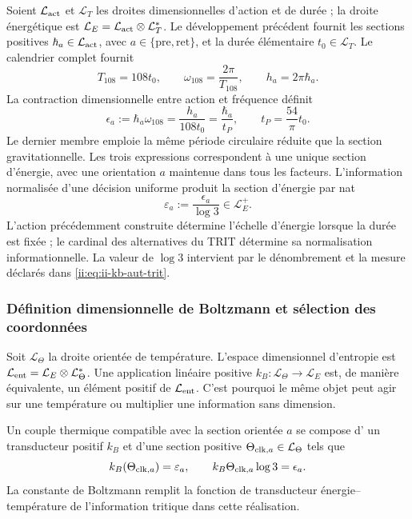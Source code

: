 Soient \(\mathcal L_{\rm act}\) et \(\mathcal L_T\) les droites
dimensionnelles d'action et de durée ; la droite énergétique est
\(\mathcal L_E=\mathcal L_{\rm act}\otimes\mathcal L_T^*\).
Le développement précédent fournit les sections positives
\(\hbar_a\in\mathcal L_{\rm act}\), avec
\(a\in\{\mathrm{pre},\mathrm{ret}\}\), et la durée élémentaire
\(t_0\in\mathcal L_T\). Le calendrier complet fournit
\[
 T_{108}=108t_0,\qquad
 \omega_{108}=\frac{2\pi}{T_{108}},\qquad
 h_a=2\pi\hbar_a.
\]
La contraction dimensionnelle entre action et fréquence définit
\begin{equation}
 \epsilon_a:=\hbar_a\omega_{108}
 =\frac{h_a}{108t_0}
 =\frac{\hbar_a}{t_P},\qquad
 t_P=\frac{54}{\pi}t_0.
 \label{ii:eq:ii-kb-aut-energia}
\end{equation}
Le dernier membre emploie la même période circulaire réduite que la section gravitationnelle. Les trois expressions correspondent à une unique section d'énergie, avec une orientation \(a\) maintenue dans tous les facteurs. L'information normalisée d'une décision uniforme produit la section d'énergie par nat
\begin{equation}
 \varepsilon_a:=\frac{\epsilon_a}{\log3}\in\mathcal L_E^+.
 \label{ii:eq:ii-kb-aut-energia-nat}
\end{equation}
L'action précédemment construite détermine l'échelle d'énergie lorsque
la durée est fixée ; le cardinal des alternatives du TRIT détermine sa
normalisation informationnelle. La valeur de \(\log3\) intervient par le
dénombrement et la mesure déclarés dans \eqref{ii:eq:ii-kb-aut-trit}.

\subsubsection{Définition dimensionnelle de Boltzmann et sélection des coordonnées}

Soit \(\mathcal L_\Theta\) la droite orientée de température. L'espace dimensionnel d'entropie est \(\mathcal L_{\rm ent}=\mathcal L_E\otimes\mathcal L_\Theta^*\). Une application linéaire positive \(k_B:\mathcal L_\Theta\to\mathcal L_E\) est, de manière équivalente, un élément positif de \(\mathcal L_{\rm ent}\). C'est pourquoi le même objet peut agir sur une température ou multiplier une information sans dimension.

\begin{definition}
Un couple thermique compatible avec la section orientée \(a\) se compose d'
un transducteur positif \(k_B\) et d'une section positive
\(\Theta_{{\rm clk},a}\in\mathcal L_\Theta\) tels que
\begin{equation}
 k_B(\Theta_{{\rm clk},a})=\varepsilon_a,
 \qquad
 k_B\Theta_{{\rm clk},a}\log3=\epsilon_a.
 \label{ii:eq:ii-kb-aut-par-termico}
\end{equation}
La constante de Boltzmann remplit la fonction de transducteur
énergie--température de l'information tritique dans cette réalisation.
\end{definition}

